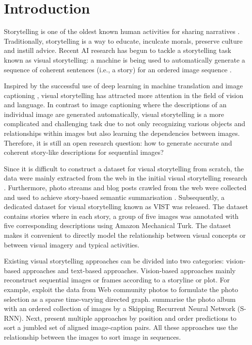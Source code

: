 \documentclass[a4paper,fleqn]{cas-sc}
\begin{document}
\maketitle
\section{Introduction}
Storytelling is one of the oldest known human activities for sharing narratives \citep{Miller2005}. Traditionally, storytelling is a way to educate, inculcate morals, preserve culture and instill advice. Recent  AI research has begun to tackle a storytelling task  known as visual storytelling: a machine is being used to automatically generate a sequence of coherent sentences (i.e., a story) for an ordered image sequence \citep{Cho2014Learning,Huang2016,Yulicheng2017}.

Inspired by the successful use of deep learning in machine translation \citep{Bahdanau2014Neural, transformer2017} and image captioning \citep{Karpathy2015Deep, Xu2015Show}, visual storytelling has attracted more attention in the field of vision and language. In contrast to image captioning where the descriptions of an individual image are generated automatically, visual storytelling is a more complicated and challenging task due to not only recognizing various objects and relationships within images but also learning the dependencies between images. Therefore, it is still an open research question: how to generate accurate and coherent story-like descriptions for sequential images?

Since it is difficult to construct a dataset for visual storytelling from scratch, the data were mainly extracted from the web in the initial visual storytelling research \citep{Kim2014, Sigurdsson2016}. Furthermore, photo streams and blog posts crawled from the web were collected and used to achieve story-based semantic summarisation \citep{KimSigal2015}. Subsequently, a dedicated dataset for visual storytelling known as VIST \citep{Huang2016} was released. The dataset contains stories where in each story, a group of five images was annotated with five corresponding descriptions using Amazon Mechanical Turk. The dataset makes it convenient to directly model the relationship between visual concepts or between visual imagery and typical activities.

Existing visual storytelling approaches can be divided into two categories: vision-based approaches and text-based approaches. Vision-based approaches mainly reconstruct sequential images or frames according to a storyline or plot. For example, \cite{Kim2014} exploit the data from Web community photos to formulate the photo selection as a sparse time-varying directed graph. \cite{Sigurdsson2016} summarise the photo album with an ordered collection of images by a Skipping Recurrent Neural Network (S-RNN). Next, \cite{SortStory2016} present multiple approaches by position and order predictions to sort a jumbled set of aligned image-caption pairs. All these approaches use the relationship between the images to sort image in sequences.
\end{document}
